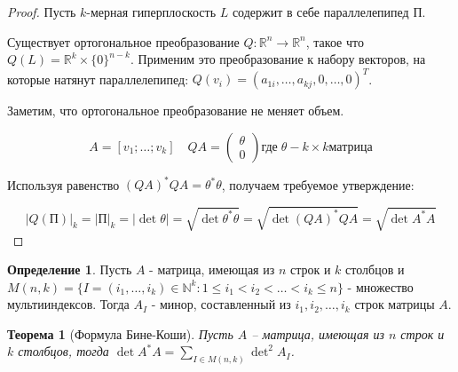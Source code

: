 \documentclass[a5paper]{article}
\newcounter{through}
\theoremstyle{plain}
\newtheorem{theorem}[through]{Теорема}
\theoremstyle{definition}
\newtheorem{definition}[through]{Определение}
\numberwithin{through}{section}
\numberwithin{equation}{section}
\begin{document}
\begin{proof}
	Пусть $k$-мерная гиперплоскость $L$ содержит в себе параллелепипед $\text{П}$.
	
	Существует ортогональное преобразование $Q : \mathbb{R}^n \to \mathbb{R}^n$, такое что $Q(L) = \mathbb{R}^k \times \{0\}^{n-k}$. Применим это преобразование к набору векторов, на которые натянут параллелепипед: $Q(v_i)=(a_{1i}, \ldots, a_{kj}, 0, \ldots, 0)^T$.
	
	Заметим, что ортогональное преобразование не меняет объем.
	
	\begin{equation*}
		A = [v_1; \ldots; v_k] \quad QA = 
		\begin{pmatrix}
			\theta \\
			0
		\end{pmatrix} 
		\text{где} \; \theta -  k \times k \text{матрица}
	\end{equation*}
	
	Используя равенство $(QA)^* QA = \theta^* \theta$, получаем требуемое утверждение:
	
	\begin{equation*}
		|Q(\text{П})|_k=|\text{П}|_k=|\det \theta|=\sqrt{\det \theta^* \theta}=\sqrt{\det (QA)^* QA}=\sqrt{\det A^* A}
	\end{equation*}
\end{proof}

\begin{definition}
	Пусть $A$ -  матрица, имеющая из $n$ строк и $k$ столбцов и $M(n,k) = \{I = (i_1, \ldots, i_k) \in \mathbb{N}^k : 1 \leq  i_1 < i_2 < \ldots < i_k \leq n \}$ - множество мультииндексов. Тогда $A_I$ - минор, составленный из $i_1, i_2, \ldots, i_k$ строк матрицы $A$.
\end{definition}

\begin{theorem}[Формула Бине-Коши]
	Пусть $A$ --  матрица, имеющая из $n$ строк и $k$ столбцов, тогда $\det A^* A = \sum\limits_{I \in M(n,k)}^{} \det^2 A_I$.
\end{theorem}
\end{document}
